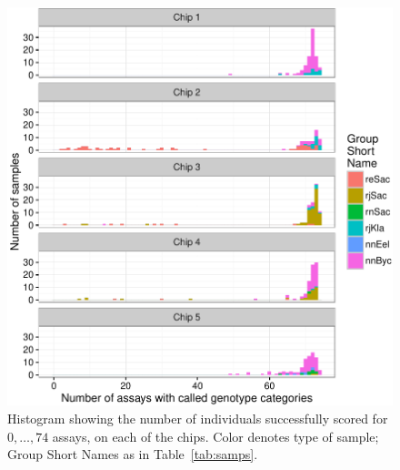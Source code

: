 \begin{figure}
\begin{center}
\includegraphics[width = \linewidth]{inputs/successful-assay-histogram-crop.pdf}
\end{center}
\caption{ Histogram showing the number of individuals
successfully scored for $0,\ldots, 74$ assays, on each of the chips.  Color denotes type of sample; Group Short
Names as in Table~\ref{tab:samps}.  \label{fig:success-histos}}
\end{figure}



